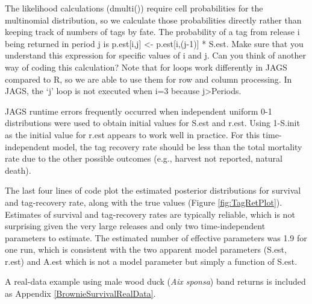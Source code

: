\documentclass[
]{krantz}
\begin{document}
The likelihood calculations (dmulti()) require cell probabilities for the multinomial distribution, so we calculate those probabilities directly rather than keeping track of numbers of tags by fate. The probability of a tag from release i being returned in period j is p.est{[}i,j{]} \textless- p.est{[}i,(j-1){]} * S.est. Make sure that you understand this expression for specific values of i and j. Can you think of another way of coding this calculation? Note that for loops work differently in JAGS compared to R, so we are able to use them for row and column processing. In JAGS, the `j' loop is not executed when i=3 because j\textgreater Periods.

JAGS runtime errors frequently occurred when independent uniform 0-1 distributions were used to obtain initial values for S.est and r.est. Using 1-S.init as the initial value for r.est appears to work well in practice. For this time-independent model, the tag recovery rate should be less than the total mortality rate due to the other possible outcomes (e.g., harvest not reported, natural death).

The last four lines of code plot the estimated posterior distributions for survival and tag-recovery rate, along with the true values (Figure \ref{fig:TagRetPlot}). Estimates of survival and tag-recovery rates are typically reliable, which is not surprising given the very large releases and only two time-independent parameters to estimate. The estimated number of effective parameters was 1.9 for one run, which is consistent with the two apparent model parameters (S.est, r.est) and A.est which is not a model parameter but simply a function of S.est.

A real-data example using male wood duck (\emph{Aix sponsa}) band returns is included as Appendix \ref{BrownieSurvivalRealData}.
\end{document}
